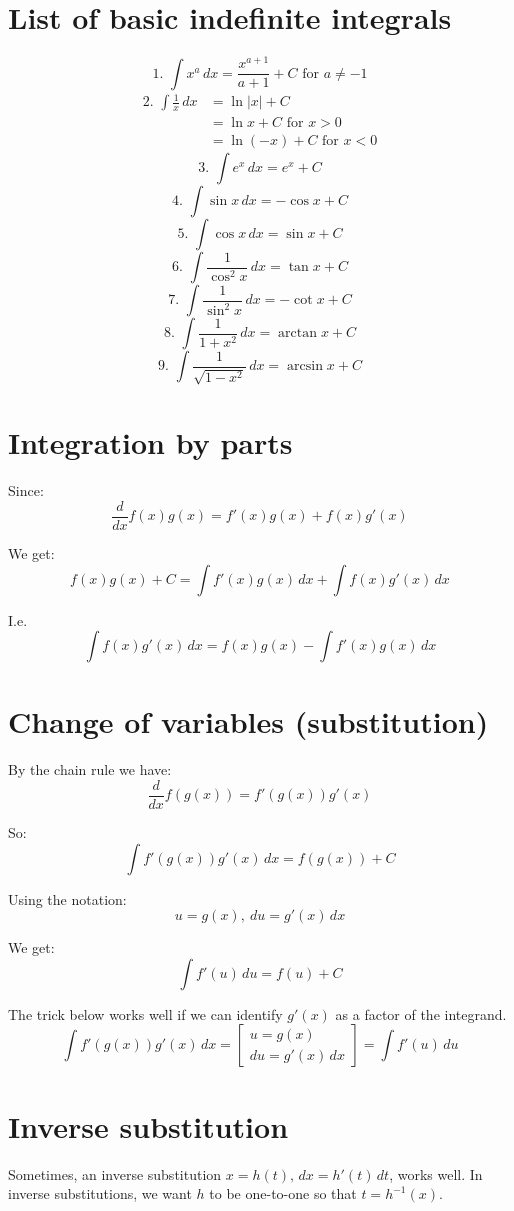 \documentclass[11pt]{article}
\begin{document}
\section{List of basic indefinite integrals}
\label{sec:orga1a80a7}
\[\text{1. } \int x^a \, dx = \frac{x^{a + 1}}{a + 1} + C \text{ for } a \ne -1\]
\begin{align*}
\text{2. } \int \frac{1}{x} \, dx &= \ln |x| + C \\
&= \ln x + C \text{ for } x > 0 \\
&= \ln (-x) + C \text{ for } x < 0
\end{align*}
\[\text{3. } \int e^x \, dx = e^x + C\]
\[\text{4. } \int \sin x \, dx = - \cos x + C\]
\[\text{5. } \int \cos x \, dx = \sin x + C\]
\[\text{6. } \int \frac{1}{\cos^2 x} \, dx = \tan x + C\]
\[\text{7. } \int \frac{1}{\sin^2 x} \, dx = - \cot x + C\]
\[\text{8. } \int \frac{1}{1 + x^2} \, dx = \arctan x + C\]
\[\text{9. } \int \frac{1}{\sqrt{1 - x^2}} \, dx = \arcsin x + C\]
\section{Integration by parts}
\label{sec:orge736479}
Since:
\[\frac{d}{dx} f(x) g(x) = f'(x) g(x) + f(x) g'(x)\]

We get:
\[f(x) g(x) + C = \int f'(x) g(x) \, dx + \int f(x) g'(x) \, dx\]

I.e.
\[\int f(x) g'(x) \, dx = f(x) g(x) - \int f'(x) g(x) \, dx\]
\section{Change of variables (substitution)}
\label{sec:org4bd54a1}
By the chain rule we have:
\[\frac{d}{dx} f(g(x)) = f'(g(x)) g'(x)\]

So:
\[\int f'(g(x)) g'(x) \, dx = f(g(x)) + C\]

Using the notation:
\[u = g(x), \ du = g'(x) \, dx\]

We get:
\[\int f'(u) \, du = f(u) + C\]

The trick below works well if we can identify \(g'(x)\) as a factor of the integrand.
\[\int f'(g(x)) g'(x) \, dx = \left[ \begin{gathered} u = g(x) \\ du = g'(x) \, dx \end{gathered} \right] = \int f'(u) \, du\]
\section{Inverse substitution}
\label{sec:orgbf38df0}
Sometimes, an inverse substitution \(x = h(t), \, dx = h'(t) \, dt\), works well. In inverse substitutions, we want \(h\) to be one-to-one so that \(t = h^{-1} (x)\).
\end{document}
